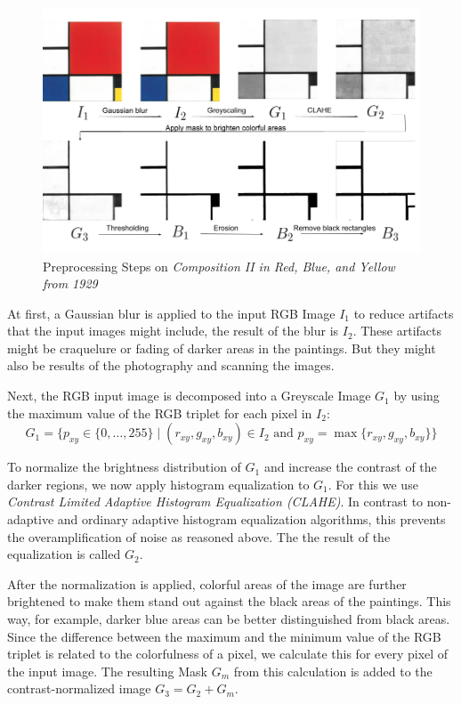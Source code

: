 \documentclass[serif,article,noparskip]{agse-thesis}
\begin{document}
\begin{figure}
  \includegraphics[width=\linewidth]{images/preprocessing_steps.png}
  \caption{Preprocessing Steps on \textit{Composition II in Red, Blue, and Yellow
  from 1929}}
  \label{fig:preprocessing}
\end{figure}

At first, a Gaussian blur is applied to the input RGB Image $I_1$ to reduce
artifacts that the input images might include, the result of the blur is $I_2$.
These artifacts might be craquelure or fading of darker areas in the paintings.
But they might also be results of the photography and scanning the images.

Next, the RGB input image is decomposed into a Greyscale Image $G_1$ by using
the maximum value of the RGB triplet for each pixel in $I_2$:
$$G_1 = \{p_{xy} \in \{0,\ldots,255\} \mid (r_{xy},g_{xy},b_{xy})\in I_2\text{ and }p_{xy}=\max\{r_{xy},g_{xy},b_{xy}\}\}$$

To normalize the brightness distribution of $G_1$ and increase the contrast of
the darker regions, we now apply histogram equalization to $G_1$. For this we
use \textit{Contrast Limited Adaptive Histogram Equalization (CLAHE)}. In
contrast to non-adaptive and ordinary adaptive histogram equalization
algorithms, this prevents the overamplification of noise as reasoned above. The
the result of the equalization is called $G_2$. \cite{Pizer1987}

After the normalization is applied, colorful areas of the image are further
brightened to make them stand out against the black areas of the paintings. This
way, for example, darker blue areas can be better distinguished from black
areas. Since the difference between the maximum and the minimum value of the RGB
triplet is related to the colorfulness of a pixel, we calculate this for every
pixel of the input image. The resulting Mask $G_m$ from this calculation is
added to the contrast-normalized image $G_3 = G_2 + G_m$.
\end{document}

